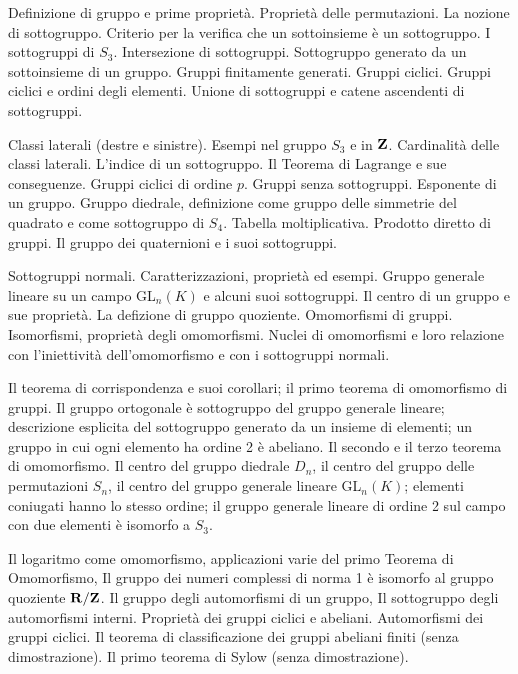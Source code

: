 
\def\abbrcorso{AL210}  
\def\titolocorso{Algebra 210: Gruppi, Anelli e Campi}
\def\sottotitolo{} 
\def\docente{Prof. Francesco Pappalardi}  
\def\crediti{9} 
\def\semestre{I}
\def\esoneri{1} 
\def\scrittofinale{1}
\def\oralefinale{1}
\def\altreprove{0} 
\Intestazione
{}
Definizione di gruppo e prime propriet\`a. Propriet\`a delle permutazioni. La nozione di sottogruppo. Criterio per la verifica che un sottoinsieme \`e un sottogruppo. I sottogruppi di $S_3$. Intersezione di sottogruppi.
Sottogruppo generato da un sottoinsieme di un gruppo. Gruppi finitamente generati. Gruppi ciclici. Gruppi ciclici e ordini degli elementi. 
Unione di sottogruppi e catene ascendenti di sottogruppi.

Classi laterali (destre e sinistre). Esempi nel gruppo $S_3$ e in ${\bf Z}$. 
Cardinalit\`a delle classi laterali. L'indice di un sottogruppo. Il Teorema di Lagrange e sue conseguenze.
Gruppi ciclici di ordine $p$. Gruppi senza sottogruppi. Esponente di un gruppo. Gruppo diedrale, 
definizione come gruppo delle simmetrie del quadrato e come sottogruppo di $S_4$. Tabella moltiplicativa.
Prodotto diretto di gruppi. Il gruppo dei quaternioni e i suoi sottogruppi.

Sottogruppi normali. Caratterizzazioni, propriet\`a ed esempi. Gruppo generale lineare su un campo GL$_n(K)$ e alcuni suoi sottogruppi.
Il centro di un gruppo e sue propriet\`a. La defizione di gruppo quoziente. Omomorfismi di gruppi. Isomorfismi, propriet\`a degli omomorfismi.
Nuclei di omomorfismi e loro relazione con l'iniettivit\`a dell'omomorfismo e con i sottogruppi normali.

Il teorema di corrispondenza e suoi corollari; il primo teorema di omomorfismo di gruppi. 
Il gruppo ortogonale \`e sottogruppo del gruppo generale lineare; descrizione esplicita del sottogruppo generato da un insieme di elementi; un gruppo in cui ogni elemento ha ordine 2 \`e abeliano. Il secondo e il terzo teorema di omomorfismo.
Il centro del gruppo diedrale $D_n$, il centro del gruppo delle permutazioni $S_n$, il centro del gruppo generale lineare GL$_n(K)$; elementi coniugati hanno lo stesso ordine; il gruppo generale lineare di ordine 2 sul campo con due elementi \`e isomorfo a $S_3$.

Il logaritmo come omomorfismo, applicazioni varie del primo Teorema di Omomorfismo, Il gruppo dei numeri complessi di norma 1 \`e isomorfo al gruppo quoziente ${\bf R}/{\bf Z}$. Il gruppo degli automorfismi di un gruppo, Il sottogruppo degli automorfismi interni.
Propriet\`a dei gruppi ciclici e abeliani. Automorfismi dei gruppi ciclici. Il teorema di classificazione dei gruppi abeliani finiti (senza dimostrazione). Il primo teorema di Sylow (senza dimostrazione). 

